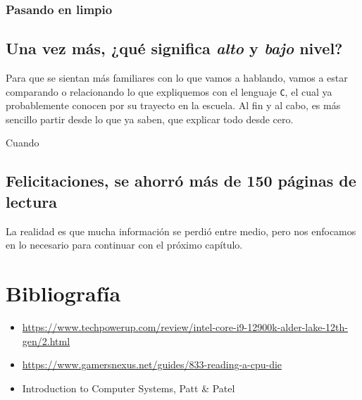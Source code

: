 \documentclass[a4paper, titlepage]{report}
\begin{document}
	
	\subsection{Pasando en limpio}
	

	\section{Una vez más, ¿qué significa \textit{alto} y \textit{bajo} nivel?}
	
	Para que se sientan más familiares con lo que vamos a hablando, vamos a estar comparando o relacionando lo que expliquemos con el lenguaje \texttt{C}, el cual ya probablemente conocen por su trayecto en la escuela. Al fin y al cabo, es más sencillo partir desde lo que ya saben, que explicar todo desde cero.
	
	Cuando 
	
	\section{Felicitaciones, se ahorró más de 150 páginas de lectura}

	La realidad es que mucha información se perdió entre medio, pero nos enfocamos en lo necesario para continuar con el próximo capítulo.
	
	\chapter{Bibliografía} %
	
	\begin{itemize}
		\item \url{https://www.techpowerup.com/review/intel-core-i9-12900k-alder-lake-12th-gen/2.html}
		\item \url{https://www.gamersnexus.net/guides/833-reading-a-cpu-die}
		\item Introduction to Computer Systems, Patt \& Patel %
	\end{itemize}
	
\end{document}
